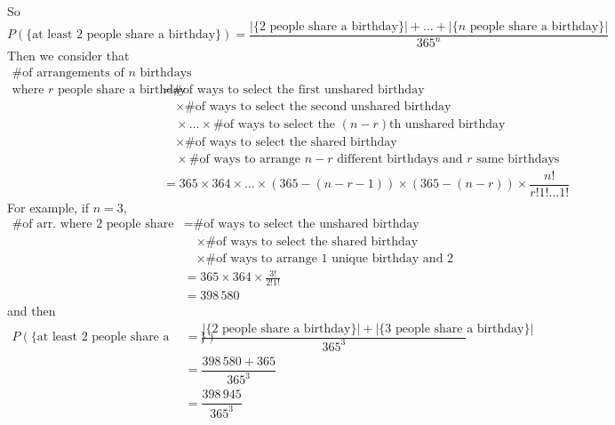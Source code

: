 \documentclass{article}
\begin{document}
So
\begin{equation*}
\boxed{
P(\{\text{at least 2 people share a birthday}\})=\dfrac{|\{\text{2 people share a birthday}\}|+\ldots+|\{\text{$n$ people share a birthday}\}|}{365^n}
}
\end{equation*}
Then we consider that
\begin{align*}
\text{\# of arrangements of $n$ birthdays}& \\
\text{where $r$ people share a birthday}& =\text{\# of ways to select the first unshared birthday}\\
& \quad\times\text{\# of ways to select the second unshared birthday}\\
& \quad\times\ldots\times\text{\# of ways to select the $(n-r)$th unshared birthday}\\
& \quad\times \text{\# of ways to select the shared birthday}\\
& \quad\times \text{\# of ways to arrange $n-r$ different birthdays and $r$ same birthdays}\\
& =365\times 364\times\ldots\times(365-(n-r-1))\times(365-(n-r))\times \dfrac{n!}{r!1!\ldots 1!}
\end{align*}
For example, if $n=3$, 
\begin{align*}
\text{\# of arr. where 2 people share a birthday}& =\text{\# of ways to select the unshared birthday}\\
& \quad\times \text{\# of ways to select the shared birthday}\\
& \quad\times\text{\# of ways to arrange 1 unique birthday and 2 same birthdays}\\
& =365\times 364\times \frac{3!}{2!1!}\\
& =398\,580
\end{align*}
and then
\begin{align*}
P(\{\text{at least 2 people share a birthday}\})&=\dfrac{|\{\text{2 people share a birthday}\}|+|\{\text{3 people share a birthday}\}|}{365^3}\\
& =\dfrac{398\,580+365}{365^3}\\
& =\dfrac{398\,945}{365^3}
\end{align*}
\end{document}
